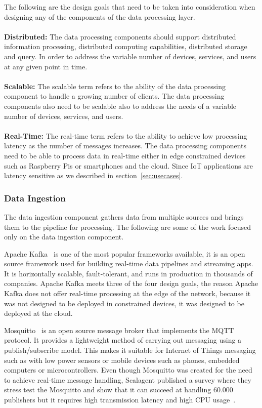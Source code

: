 The following are the design goals that need to be taken into consideration when designing any of the components of the data processing layer.
\\\\
\textbf{Distributed:} The data processing components should support distributed information processing, distributed computing capabilities, distributed storage and query. In order to address the variable number of devices, services, and users at any given point in time.
\\\\
\textbf{Scalable:} The scalable term refers to the ability of the data processing component to handle a growing number of
clients. The data processing components also need to be scalable also to address the needs of a variable number of devices, services, and users. 
\\\\
\textbf{Real-Time:} The real-time term refers to the ability to achieve low processing latency as the number of messages increases. The data processing components need to be able to process data in real-time either in edge constrained devices such as Raspberry Pis or smartphones and the cloud. Since IoT applications are latency sensitive as we described in section~\ref{sec:usecases}. 

\subsubsection{Data Ingestion}

The data ingestion component gathers data from multiple sources and brings them to the pipeline for processing. The following are some of the work focused only on the data ingestion component.

Apache Kafka~\cite{kafka} is one of the most popular frameworks available, it is an open source framework used for building real-time data pipelines and streaming apps. It is horizontally scalable, fault-tolerant, and runs in production in thousands of companies. Apache Kafka meets three of the four design goals, the reason Apache Kafka does not offer real-time processing at the edge of the network, because it was not designed to be deployed in constrained devices, it was designed to be deployed at the cloud. 

Mosquitto~\cite{mosquitto} is an open source message broker that implements the MQTT protocol. It provides a lightweight method of carrying out messaging using a publish/subscribe model. This makes it suitable for Internet of Things messaging such as with low power sensors or mobile devices such as phones, embedded computers or microcontrollers. Even though Mosquitto was created for the need to achieve real-time message handling, Scalagent published a survey where they stress test the Mosquitto and show that it can succeed at handling 60.000 publishers but it requires high transmission latency and high CPU usage~\cite{mqtt}.

